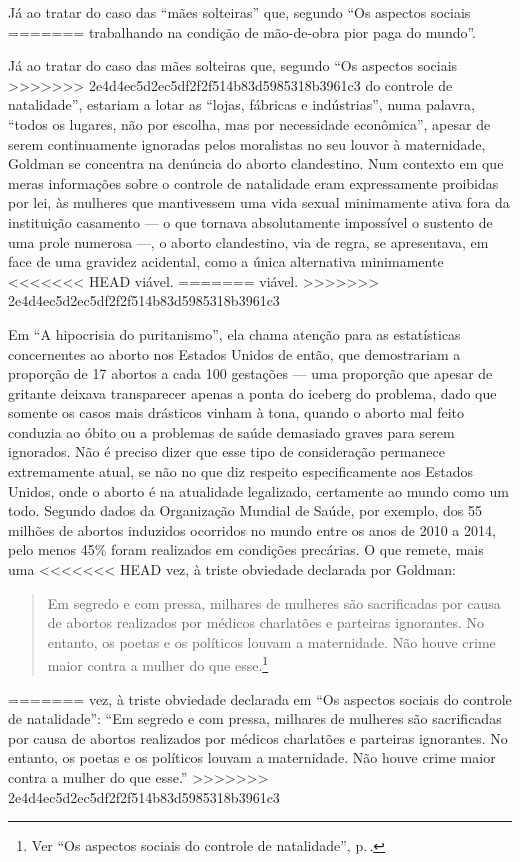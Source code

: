 Já ao
tratar do caso das ``mães solteiras'' que, segundo ``Os aspectos sociais
=======
trabalhando na condição de mão-de-obra pior paga do mundo''. 

Já ao
tratar do caso das mães solteiras que, segundo ``Os aspectos sociais
>>>>>>> 2e4d4ec5d2ec5df2f2f514b83d5985318b3961c3
do controle de natalidade'', estariam a lotar as ``lojas, fábricas e
indústrias'', numa palavra, ``todos os lugares, não por escolha, mas por
necessidade econômica'', apesar de serem continuamente ignoradas pelos
moralistas no seu louvor à maternidade, Goldman se concentra na denúncia
do aborto clandestino. Num contexto em que meras informações sobre o
controle de natalidade eram expressamente proibidas por lei, às mulheres
que mantivessem uma vida sexual minimamente ativa fora da instituição
casamento --- o que tornava absolutamente impossível o sustento de uma
prole numerosa ---, o aborto clandestino, via de regra, se apresentava,
em face de uma gravidez acidental, como a única alternativa minimamente
<<<<<<< HEAD
viável.
=======
viável. 
>>>>>>> 2e4d4ec5d2ec5df2f2f514b83d5985318b3961c3

Em ``A hipocrisia do puritanismo'', ela chama atenção para as
estatísticas concernentes ao aborto nos Estados Unidos de então, que
demostrariam a proporção de 17 abortos a cada 100 gestações --- uma
proporção que apesar de gritante deixava transparecer apenas a ponta do
iceberg do problema, dado que somente os casos mais drásticos vinham à
tona, quando o aborto mal feito conduzia ao óbito ou a problemas de
saúde demasiado graves para serem ignorados. Não é preciso dizer que
esse tipo de consideração permanece extremamente atual, se não no que
diz respeito especificamente aos Estados Unidos, onde o aborto é na
atualidade legalizado, certamente ao mundo como um todo. Segundo dados
da Organização Mundial de Saúde, por exemplo, dos 55 milhões de abortos
induzidos ocorridos no mundo entre os anos de 2010 a 2014, pelo menos
45\% foram realizados em condições precárias. O que remete, mais uma
<<<<<<< HEAD
vez, à triste obviedade declarada por Goldman:

\begin{quote}
Em segredo e com pressa, milhares de
mulheres são sacrificadas por causa de abortos realizados por médicos
charlatões e parteiras ignorantes. No entanto, os poetas e os políticos
louvam a maternidade. Não houve crime maior contra a mulher do que esse.\footnote{Ver ``Os aspectos sociais do controle de natalidade'', p.\,\pageref{aborto}.}
\end{quote}
=======
vez, à triste obviedade declarada em ``Os aspectos sociais do controle
de natalidade'': ``Em segredo e com pressa, milhares de mulheres são
sacrificadas por causa de abortos realizados por médicos charlatões e
parteiras ignorantes. No entanto, os poetas e os políticos louvam a
maternidade. Não houve crime maior contra a mulher do que esse.''
>>>>>>> 2e4d4ec5d2ec5df2f2f514b83d5985318b3961c3

